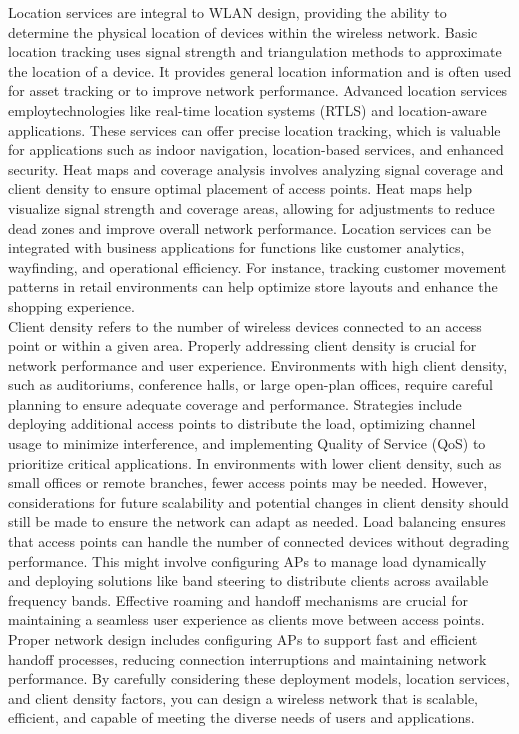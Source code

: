 \documentclass{article}
\begin{document}
	Location services are integral to WLAN design, providing the ability to determine the physical location of devices within the wireless network. Basic location tracking uses signal strength and triangulation methods to approximate the location of a device. It provides general location information and is often used for asset tracking or to improve network performance. Advanced location services employtechnologies like real-time location systems (RTLS) and location-aware applications. These services can offer precise location tracking, which is valuable for applications such as indoor navigation, location-based services, and enhanced security. Heat maps and coverage analysis involves analyzing signal coverage and client density to ensure optimal placement of access points. Heat maps help visualize signal strength and coverage areas, allowing for adjustments to reduce dead zones and improve overall network performance. Location services can be integrated with business applications for functions like customer analytics, wayfinding, and operational efficiency. For instance, tracking customer movement patterns in retail environments can help optimize store layouts and enhance the shopping experience.\\

	Client density refers to the number of wireless devices connected to an access point or within a given area. Properly addressing client density is crucial for network performance and user experience. Environments with high client density, such as auditoriums, conference halls, or large open-plan offices, require careful planning to ensure adequate coverage and performance. Strategies include deploying additional access points to distribute the load, optimizing channel usage to minimize interference, and implementing Quality of Service (QoS) to prioritize critical applications. In environments with lower client density, such as small offices or remote branches, fewer access points may be needed. However, considerations for future scalability and potential changes in client density should still be made to ensure the network can adapt as needed. Load balancing ensures that access points can handle the number of connected devices without degrading performance. This might involve configuring APs to manage load dynamically and deploying solutions like band steering to distribute clients across available frequency bands. Effective roaming and handoff mechanisms are crucial for maintaining a seamless user experience as clients move between access points. Proper network design includes configuring APs to support fast and efficient handoff processes, reducing connection interruptions and maintaining network performance. By carefully considering these deployment models, location services, and client density factors, you can design a wireless network that is scalable, efficient, and capable of meeting the diverse needs of users and applications.\\
\end{document}
